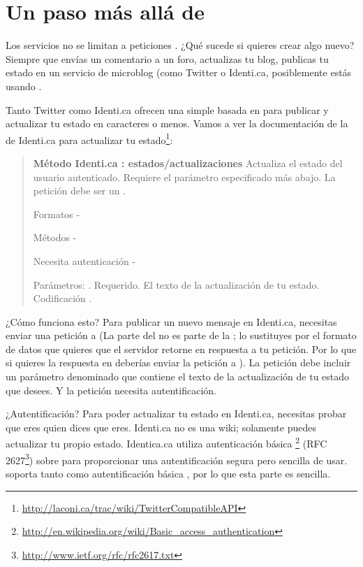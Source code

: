 \section{Un paso más allá de }

Los servicios  no se limitan a peticiones . ¿Qué sucede si quieres crear algo nuevo? Siempre que envías un comentario a un foro, actualizas tu blog, publicas tu estado en un servicio de microblog (como Twitter o Identi.ca, posiblemente estás usando .

Tanto Twitter como Identi.ca ofrecen una  simple basada en  para publicar y actualizar tu estado en  caracteres o menos. Vamos a ver la documentación de la  de Identi.ca para actualizar tu estado\footnote{\href{http://laconi.ca/trac/wiki/TwitterCompatibleAPI}{http://laconi.ca/trac/wiki/TwitterCompatibleAPI}}:

\begin{quote}
\textbf{Método Identi.ca : estados/actualizaciones}
Actualiza el estado del usuario autenticado. Requiere el parámetro  especificado más abajo. La petición debe ser un .


Formatos - 

Métodos  - 

Necesita autenticación - 

Parámetros: . Requerido. El texto de la actualización de tu estado. Codificación .

\end{quote}

¿Cómo funciona esto? Para publicar un nuevo mensaje en Identi.ca, necesitas enviar una petición  a  (La parte del  no es parte de la ; lo sustituyes por el formato de datos que quieres que el servidor retorne en respuesta a tu petición. Por lo que si quieres la respuesta en  deberías enviar la petición a ). La petición debe incluir un parámetro denominado  que contiene el texto de la actualización de tu estado que desees. Y la petición necesita autentificación.

¿Autentificación? Para poder actualizar tu estado en Identi.ca, necesitas probar que eres quien dices que eres. Identi.ca no es una wiki; solamente puedes actualizar tu propio estado. Identica.ca utiliza autenticación básica \footnote{\href{http://en.wikipedia.org/wiki/Basic\_access\_authentication}{http://en.wikipedia.org/wiki/Basic\_access\_authentication}} (RFC 2627\footnote{\href{http://www.ietf.org/rfc/rfc2617.txt}{http://www.ietf.org/rfc/rfc2617.txt}}) sobre  para proporcionar una autentificación segura pero sencilla de usar.  soporta tanto  como autentificación básica , por lo que esta parte es sencilla.

